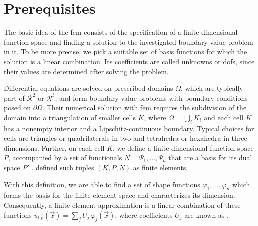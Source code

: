 \section{Prerequisites}
\label{sec:prerequisites}
\glsresetall


The basic idea of the \gls{fem} consists of the specification of a finite-dimensional function space and finding a solution to the investigated boundary value problem in it. To be more precise, we pick a suitable set of basis functions for which the solution is a linear combination. Its coefficients are called unknowns or \glspl{dof}, since their values are determined after solving the problem.

Differential equations are solved on prescribed domains $\Omega$, which are typically part of $\mathcal{R}^2$ or $\mathcal{R}^3$, and form boundary value problems with boundary conditions posed on $\partial \Omega$.
Their numerical solution with \gls{fem} requires the subdivision of the domain into a triangulation of smaller cells $K$, where $\Omega = \bigcup_{i} K_i$ and each cell $K$ has a nonempty interior and a Lipschitz-continuous boundary. Typical choices for cells are triangles or quadrilaterals in two and tetrahedra or hexahedra in three dimensions.
Further, on each cell $K$, we define a finite-dimensional function space $P$, accompanied by a set of functionals $N = {\Psi_1, \ldots, \Psi_n}$ that are a basis for its dual space $P'$
. \textcite[Sec.~2.1]{ciarlet1978} defined such tuples $(K,P,N)$ as finite elements.

With this definition, we are able to find a set of shape functions ${\varphi_1, \ldots, \varphi_n}$ which forms the basis for the finite element space and characterizes its dimension.
Consequently, a finite element approximation is a linear combination of these functions $u_{\text{hp}}(\vec{x}) = \sum_{j} U_j \, \varphi_j(\vec{x})$, where coefficients $U_j$ are known as .


